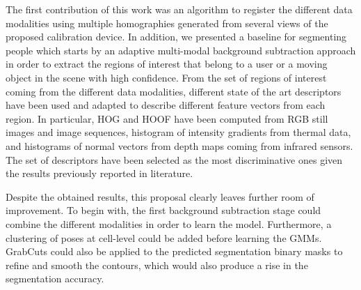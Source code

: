 \documentclass[10pt,twocolumn,letterpaper]{article}
\begin{document}
The first contribution of this work was an algorithm to register the different data modalities using multiple homographies generated from several views of the proposed calibration device. In addition, we presented a baseline for segmenting people which starts by an adaptive multi-modal background subtraction approach in order to extract the regions of interest that belong to a user or a moving object in the scene with high confidence. From the set of regions of interest coming
from the different data modalities, different state of the art descriptors have been used
and adapted to describe different feature vectors from each region. In particular, HOG and HOOF have been computed from RGB still images and image sequences, histogram of intensity gradients from thermal data, and histograms of normal vectors from depth maps coming from infrared sensors. The set of descriptors have been selected as the most discriminative ones given the results previously reported in literature.

Despite the obtained results, this proposal clearly leaves further room of improvement. To
begin with, the first background subtraction stage could combine the different modalities
in order to learn the model. Furthermore, a clustering of poses at cell-level could be
added before learning the GMMs. GrabCuts could also be applied to the predicted
segmentation binary masks to refine and smooth the contours, which would also produce
a rise in the segmentation accuracy.
{\small


}
\end{document}
